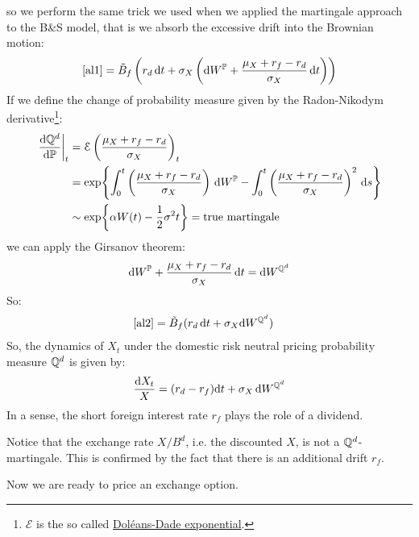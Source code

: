 so we perform the same trick we used when we applied the martingale approach to the B\&S model, that is we absorb the excessive drift into the Brownian motion:
\begin{equation}\label{al2}
    \eqref{al1} = \Tilde{B}_f\left(r_d\,\dd t + \sigma_X\left(\dd W^{\mathbb{P}} + \dfrac{\mu_X + r_f-r_d}{\sigma_X}\,\dd t\right)\right)
\end{equation}
If we define the change of probability measure given by the Radon-Nikodym derivative\footnote{$\mathcal{E}$ is the so called \href{https://en.wikipedia.org/wiki/Dol\%C3\%A9ans-Dade\_exponential}{Doléans-Dade exponential}.}:
\begin{align}
    \notag\eval{\frac{\dd \Qmeas^d}{\dd \Pmeas}}_t &= \mathcal{E}\left(\dfrac{\mu_X + r_f-r_d}{\sigma_X}\right)_t \\
    &=
    \notag\exp{\int_0^t \left(\dfrac{\mu_X + r_f-r_d}{\sigma_X}\right)\,\dd W^{\Pmeas} - \int_0^t \left(\dfrac{\mu_X + r_f-r_d}{\sigma_X}\right)^2\,\dd s} \\
    &\sim 
    \exp{\alpha W(t) - \frac{1}{2}\sigma^2 t} = \text{true martingale}
\end{align}
we can apply the Girsanov theorem:
\begin{equation*}
    \dd W^{\mathbb{P}} + \dfrac{\mu_X + r_f-r_d}{\sigma_X}\,\dd t = \dd W^{\mathbb{Q}^d}
\end{equation*}
So:
\begin{align}
    \eqref{al2} &= \Tilde{B}_f(r_d\,\dd t + \sigma_X\dd W^{\mathbb{Q}^d})
\end{align}
So, the dynamics of $X_t$ under the domestic risk neutral pricing probability measure $\mathbb{Q}^d$ is given by:
\begin{equation}\label{dynX}
    \dfrac{\dd X_t}{X} = (r_d - r_f)\dd t + \sigma_X\,\dd W^{\mathbb{Q}^d}
\end{equation}
In a sense, the short foreign interest rate $r_f$ plays the role of a dividend.
\begin{remark}
    Notice that the exchange rate $X/B^d$, i.e. the discounted $X$, is not a $\mathbb{Q}^d$-martingale. This is confirmed by the fact that there is an additional drift $r_f$.
\end{remark} %
Now we are ready to price an exchange option.
